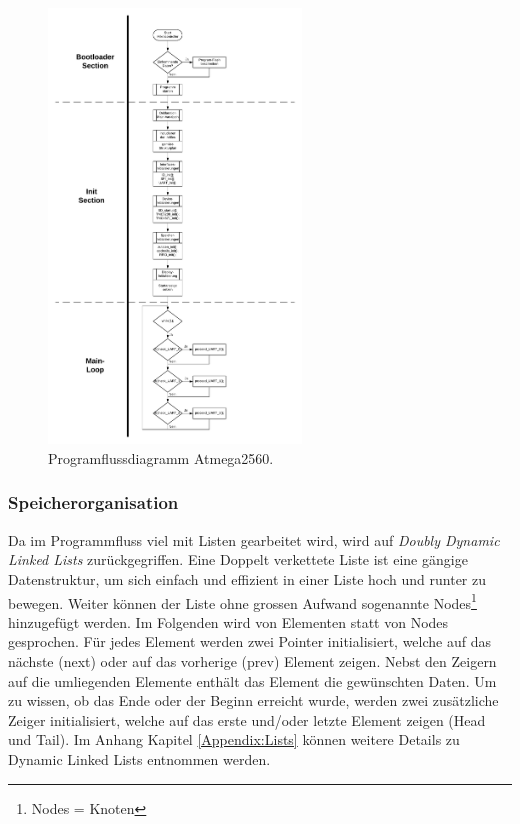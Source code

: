\begin{figure}[h!]
	\centering
	\includegraphics[width=0.6\textwidth]{graphics/Programmfluss_Atmega2560.pdf}
	\caption{Programflussdiagramm Atmega2560.}
	\label{fig:Programmfluss_Atmega2560}
\end{figure}
\newpage


\subsubsection{Speicherorganisation}\label{subsubsec:Speicherorganisation}

Da im Programmfluss viel mit Listen gearbeitet wird, wird auf \textit{Doubly Dynamic Linked Lists} zurückgegriffen.
Eine Doppelt verkettete Liste ist eine gängige Datenstruktur, um sich einfach und effizient in einer Liste hoch und runter zu bewegen. Weiter können der Liste ohne grossen Aufwand sogenannte Nodes\footnote{Nodes = Knoten} hinzugefügt werden. Im Folgenden wird von Elementen statt von Nodes gesprochen. Für jedes Element werden zwei Pointer initialisiert, welche auf das nächste (next) oder auf das vorherige (prev) Element zeigen. Nebst den Zeigern auf die umliegenden Elemente enthält das Element die gewünschten Daten. Um zu wissen, ob das Ende oder der Beginn erreicht wurde, werden zwei zusätzliche Zeiger initialisiert, welche auf das erste und/oder letzte Element zeigen (Head und Tail). Im Anhang Kapitel \ref{Appendix:Lists} können weitere Details zu Dynamic Linked Lists entnommen werden.\cite{lenz_artikel_2016}

